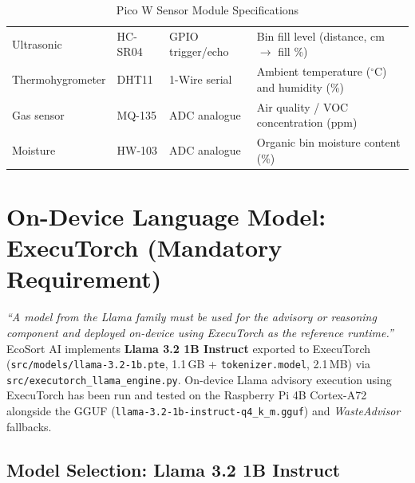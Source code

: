 \documentclass[12pt,a4paper]{article}
\begin{document}
\renewcommand{\arraystretch}{1.30}
\begin{table}[H]
\centering
\caption{Pico W Sensor Module Specifications}
\label{tab:sensors}
\small
\begin{tabularx}{\linewidth}{@{} L{3.1cm} L{2.0cm} L{2.8cm} X @{}}
\toprule
{} &  &  &  \\
\midrule
{}
Ultrasonic       & HC-SR04 & GPIO trigger/echo & Bin fill level (distance, cm $\to$ fill \%) \\
Thermohygrometer & DHT11   & 1-Wire serial     & Ambient temperature ($^\circ\mathrm{C}$) and humidity (\%) \\
Gas sensor     & MQ-135   & ADC analogue      & Air quality / VOC concentration (ppm) \\
Moisture       & HW-103   & ADC analogue      & Organic bin moisture content (\%) \\
\bottomrule
\end{tabularx}
\end{table}

\clearpage

\section{On-Device Language Model: ExecuTorch (Mandatory Requirement)}

\begin{reqbox}
\textit{``A model from the Llama family must be used for the advisory or reasoning
component and deployed on-device using ExecuTorch as the reference runtime.''}\\[6pt]
EcoSort AI implements \textbf{Llama 3.2 1B Instruct} exported to ExecuTorch
(\texttt{src/models/llama-3.2-1b.pte}, 1.1\,GB + \texttt{tokenizer.model}, 2.1\,MB)
via \texttt{src/executorch\_llama\_engine.py}. On-device Llama advisory execution using
ExecuTorch has been run and tested on the Raspberry Pi 4B Cortex-A72 alongside the GGUF
(\texttt{llama-3.2-1b-instruct-q4\_k\_m.gguf}) and \textit{WasteAdvisor} fallbacks.
\end{reqbox}

\subsection{Model Selection: Llama 3.2 1B Instruct}
\end{document}
